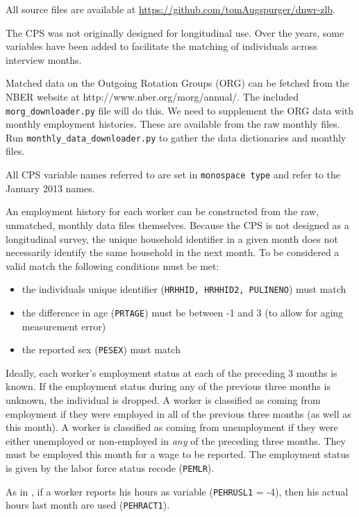\documentclass[11pt]{article}
\begin{document}
All source files are available at \href{https://github.com/tomAugspurger/dnwr-zlb}{https://github.com/tomAugspurger/dnwr-zlb}.

The CPS was not originally designed for longitudinal use.
Over the years, some variables have been added to facilitate the matching of individuals across interview months.

Matched data on the Outgoing Rotation Groups (ORG) can be fetched from the NBER website at http://www.nber.org/morg/annual/.
The included \texttt{morg\_downloader.py} file will do this.
We need to supplement the ORG data with monthly employment histories.
These are available from the raw monthly files.
Run \texttt{monthly\_data\_downloader.py} to gather the data dictionaries and monthly files.

All CPS variable names referred to are set in \texttt{monospace type} and refer to the January 2013 names.

An employment history for each worker can be constructed from the raw, unmatched, monthly data files themselves.
Because the CPS is not designed as a longitudinal survey, the unique household identifier in a given month does not necessarily identify the same household in the next month.
To be considered a valid match the following conditions must be met:

\begin{itemize}
    \item the individuals unique identifier (\texttt{HRHHID, HRHHID2, PULINENO}) must match
    \item the difference in age (\texttt{PRTAGE}) must be between -1 and 3 (to allow for aging measurement error)
    \item the reported sex (\texttt{PESEX}) must match
\end{itemize}

Ideally, each worker's employment status at each of the preceding 3 months is known.
If the employment status during any of the previous three months is unknown, the individual is dropped.
A worker is classified as coming from employment if they were employed in all of the previous three months (as well as this month).
A worker is classified as coming from unemployment if they were either unemployed or non-employed in \emph{any} of the preceding three months.
They must be employed this month for a wage to be reported.
The employment status is given by the labor force status recode (\texttt{PEMLR}).

As in \cite{haefke_sonntag_vanRens_2013}, if a worker reports his hours as variable (\texttt{PEHRUSL1} = -4), then his actual hours last month are used (\texttt{PEHRACT1}).
\end{document}
